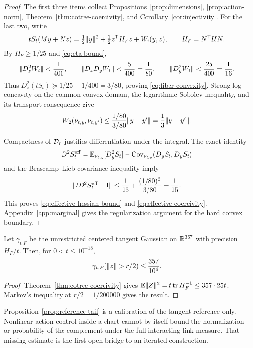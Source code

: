 \begin{proof}
The first three items collect Propositions~\ref{prop:dimensions},
\ref{prop:action-norm}, Theorem~\ref{thm:cotree-coercivity}, and
Corollary~\ref{cor:injectivity}.  For the last two, write
\[
 tS_t(My+Nz)=\tfrac12\lVert y\rVert^2
 +\tfrac12 z^{\mathsf T}H_Fz+W_t(y,z),
 \qquad H_F=N^{\mathsf T}HN.
\]
By $H_F\ge1/25$ and \eqref{eq:eta-bound},
\[
 \lVert D_z^2W_t\rVert<\frac1{400},\qquad
 \lVert D_zD_yW_t\rVert<\frac5{400}=\frac1{80},\qquad
 \lVert D_y^2W_t\rVert<\frac{25}{400}=\frac1{16}.
\]
Thus $D_z^2(tS_t)\succeq1/25-1/400=3/80$, proving
\eqref{eq:fiber-convexity}.  Strong log-concavity on the common convex domain,
the logarithmic Sobolev inequality, and its transport consequence
\cite{OttoVillani2000} give
\[
 W_2(\nu_{t,y},\nu_{t,y'})
 \le\frac{1/80}{3/80}\lVert y-y'\rVert=\frac13\lVert y-y'\rVert.
\]

Compactness of $\mathcal D_r$ justifies differentiation under the integral.  The
exact identity
\begin{equation}\label{eq:hessian-identity}
 D^2S_t^{\mathrm{eff}}
 =\mathbb E_{\nu_{t,y}}[D_y^2S_t]
  -\operatorname{Cov}_{\nu_{t,y}}(D_yS_t,D_yS_t)
\end{equation}
and the Brascamp--Lieb covariance inequality
\cite{BrascampLieb1976} imply
\[
 \lVert tD^2S_t^{\mathrm{eff}}-\mathrm I\rVert
 \le\frac1{16}+\frac{(1/80)^2}{3/80}
 =\frac1{15}.
\]
This proves \eqref{eq:effective-hessian-bound} and
\eqref{eq:effective-coercivity}.  Appendix~\ref{app:marginal} gives the
regularization argument for the hard convex boundary.
\end{proof}

\begin{proposition}\label{prop:reference-tail}
Let $\gamma_{t,F}$ be the unrestricted centered tangent Gaussian on
$\mathbb R^{357}$ with precision $H_F/t$.  Then, for $0<t\le10^{-18}$,
\[
 \gamma_{t,F}(\lVert z\rVert>r/2)\le\frac{357}{10^6}.
\]
\end{proposition}

\begin{proof}
Theorem~\ref{thm:cotree-coercivity} gives
$\mathbb E\lVert Z\rVert^2=t\operatorname{tr}H_F^{-1}\le357\cdot25t$.
Markov's inequality at $r/2=1/200000$ gives the result.
\end{proof}

\begin{remark}
Proposition~\ref{prop:reference-tail} is a calibration of the tangent
reference only.  Nonlinear action control inside a chart cannot by itself
bound the normalization or probability of the complement under the full
interacting link measure.  That missing estimate is the first open bridge to
an iterated construction.
\end{remark}
